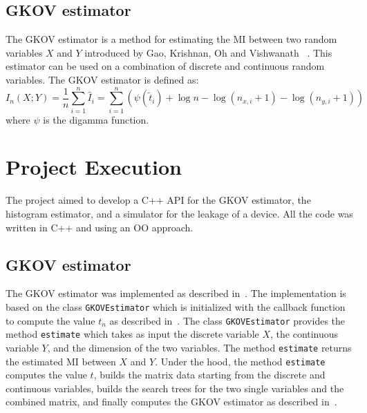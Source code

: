 \documentclass[12pt]{article}
\begin{document}
    \subsection{GKOV estimator}\label{subsec:gkov}
    The GKOV estimator is a method for estimating the MI between two random variables $X$ and $Y$ introduced by Gao, Krishnan, Oh and Vishwanath ~\cite{gkov}.
    This estimator can be used on a combination of discrete and continuous random variables.
    The GKOV estimator is defined as:
    \begin{equation}
        I_n(X;Y) = \frac{1}{n} \sum_{i=1}^n \hat{I}_i = \sum_{i=1}^n \left( \psi(\tilde{t}_i) + \log n - \log(n_{x,i}+1) - \log(n_{y,i}+1) \right)\label{eq:gkov}
    \end{equation}
    where $\psi$ is the digamma function.

    \section{Project Execution}\label{sec:execution}
    The project aimed to develop a C++ API for the GKOV estimator, the histogram estimator, and a simulator for the leakage of a device.
    All the code was written in C++ and using an OO approach.

    \subsection{GKOV estimator}\label{subsec:gkov_impl}
    The GKOV estimator was implemented as described in~\cite{gkov}.
    The implementation is based on the class \texttt{GKOVEstimator} which is initialized with the callback function to compute the value $t_n$ as described in~\cite{roy_leakage_2022}.
    The class \texttt{GKOVEstimator} provides the method \texttt{estimate} which takes as input the discrete variable $X$, the continuous variable $Y$, and the dimension of the two variables.
    The method \texttt{estimate} returns the estimated MI between $X$ and $Y$.
    Under the hood, the method \texttt{estimate} computes the value $t$, builds the matrix data starting from the discrete and continuous variables, builds the search trees for the two single variables and the combined matrix, and finally computes the GKOV estimator as described in~\cite{roy_leakage_2022}.
\end{document}
